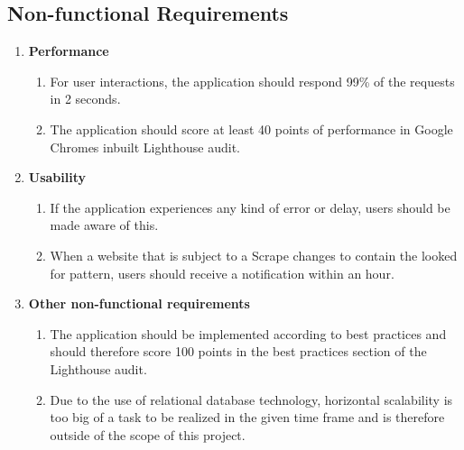 \documentclass[titlepage, 12pt]{article}
\begin{document}
\subsection{Non-functional Requirements}

\begin{enumerate}
  \item \textbf{Performance}
        \begin{enumerate}
          \item For user interactions, the application should respond 99\% of the requests in 2 seconds.
          \item The application should score at least 40 points of performance in Google Chromes inbuilt Lighthouse audit.
        \end{enumerate}
  \item \textbf{Usability}
        \begin{enumerate}
          \item If the application experiences any kind of error or delay, users should be made aware of this.
          \item When a website that is subject to a Scrape changes to contain the looked for pattern, users should receive a notification within an hour.
        \end{enumerate}
  \item \textbf{Other non-functional requirements}
        \begin{enumerate}
          \item The application should be implemented according to best practices and should therefore score 100 points in the best practices section of the Lighthouse audit.
          \item Due to the use of relational database technology, horizontal scalability is too big of a task to be realized in the given time frame and is therefore outside of the scope of this project.
        \end{enumerate}
\end{enumerate}

\pagebreak

\listoftables

\pagebreak



\end{document}
